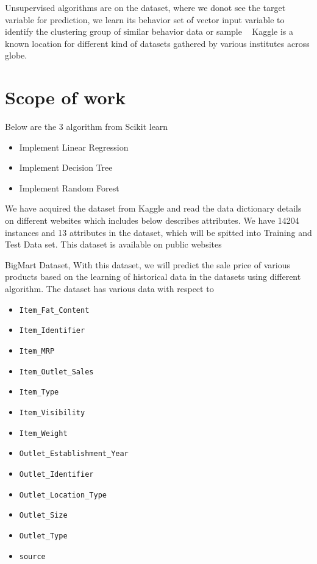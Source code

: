 Unsupervised algorithms are on the dataset, where we donot see the target variable 
for prediction, we learn its behavior set of vector input variable to identify the 
clustering group of similar behavior data or sample
~\cite{sckitml}
Kaggle is a known location for different kind of datasets gathered by various 
institutes across globe.

\section{Scope of work}

Below are the 3 algorithm from Scikit learn
\begin{itemize}
\item Implement Linear Regression
\item Implement Decision Tree
\item Implement Random Forest
\end{itemize}

We have acquired the dataset from Kaggle and read the data dictionary details on 
different websites which includes below describes attributes. We have 14204 instances and 13 
attributes in the dataset, which will be spitted into Training and Test Data set. This dataset 
is available on public websites

BigMart Dataset, With this dataset, we will predict the sale price of various products based 
on the learning of historical data in the datasets using different algorithm. The dataset has 
various data with respect to
\begin{itemize}
\item \verb|Item_Fat_Content|
\item \verb|Item_Identifier|
\item \verb|Item_MRP|
\item \verb|Item_Outlet_Sales|
\item \verb|Item_Type|
\item \verb|Item_Visibility|
\item \verb|Item_Weight|
\item \verb|Outlet_Establishment_Year|
\item \verb|Outlet_Identifier|
\item \verb|Outlet_Location_Type|
\item \verb|Outlet_Size|
\item \verb|Outlet_Type|
\item \verb|source|
\end{itemize}
~\cite{kaggleds}

